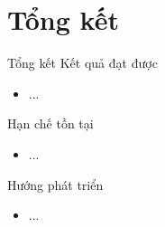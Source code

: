 \section{Tổng kết}
\begin{frame}{Tổng kết}
Kết quả đạt được
\begin{itemize}
	\item ...
\end{itemize}
Hạn chế tồn tại
\begin{itemize}
	\item ...
\end{itemize}
Hướng phát triển
\begin{itemize}
	\item ...
\end{itemize}
\end{frame}
